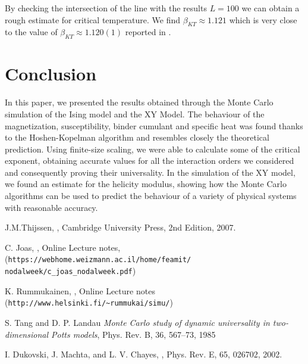 \documentclass[twoside]{article}
\begin{document}
\begin{multicols}{2}
By checking the intersection of the line with the results $L=100$ we can obtain a rough estimate for critical temperature. We find $\beta_{KT} \approx 1.121$ which is very close to the value of $\beta_{KT} \approx 1.120(1)$ reported in \cite{dukovski}.

\section{Conclusion}
In this paper, we presented the results obtained through the Monte Carlo simulation of the Ising model and the XY Model.
The behaviour of the magnetization, susceptibility, binder cumulant and specific heat was found thanks to the Hoshen-Kopelman algorithm and resembles closely the theoretical prediction. Using finite-size scaling, we were able to calculate some of the critical exponent, obtaining accurate values for all the interaction orders we considered and consequently proving their universality.
In the simulation of the XY model, we found an estimate for the helicity modulus, showing how the Monte Carlo algorithms can be used to predict the behaviour of a variety of physical systems with reasonable accuracy.


\begin{thebibliography}{99} %

J.M.Thijssen,
, Cambridge University Press, 2nd Edition, 2007.

C. Joas, 
, Online Lecture notes, (\verb+https://webhome.weizmann.ac.il/home/feamit/+ \\ \verb+nodalweek/c_joas_nodalweek.pdf+)

K. Rummukainen,
, Online Lecture notes (\verb+http://www.helsinki.fi/~rummukai/simu/+)

S. Tang and D. P. Landau
{\em Monte Carlo study of dynamic universality in two-dimensional Potts models}, Phys. Rev. B, 36, 567–73, 1985

I. Dukovski, J. Machta, and L. V. Chayes, 
, Phys. Rev. E, 65, 026702, 2002.
\end{thebibliography}

\end{multicols}
\end{document}
